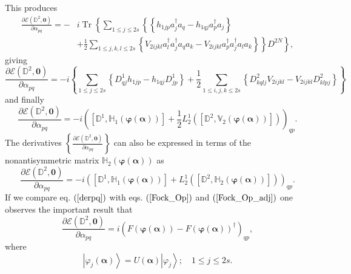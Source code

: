 \documentclass[titlepage]{article}%
\begin{document}
This produces%
\begin{align}
\frac{\partial\mathcal{E}\left(  \mathbb{D}^{2},\bm{0}\right)  }%
{\partial\alpha_{pq}}=-  &  i\operatorname{Tr}\left\{  \sum_{1\leq j\leq
2s}\left\{  \left\{  h_{1jp}a_{j}^{\dagger}a_{q}-h_{1qj}a_{p}^{\dagger}%
a_{j}\right\}  \right.  \right. \nonumber\\
&  +\left.  \left.  \frac{1}{2}\sum_{1\leq j,k,l\leq2s}\left\{  V_{2ijkl}%
a_{l}^{\dagger}a_{j}^{\dagger}a_{q}a_{k}-V_{2ijkl}a_{p}^{\dagger}%
a_{j}^{\dagger}a_{l}a_{k}\right\}  \right\}  D^{2N}\right\}  ,
\end{align}
giving%
\begin{equation}
\frac{\partial\mathcal{E}\left(  \mathbb{D}^{2},\bm{0}\right)  }%
{\partial\alpha_{pq}}=-i\left\{  \sum_{1\leq j\leq2s}\left\{  D_{qj}%
^{1}h_{1jp}-h_{1qj}D_{jp}^{1}\right\}  +\frac{1}{2}\sum_{1\leq i,j,k\leq
2s}\left\{  D_{kqlj}^{2}V_{2ijkl}-V_{2ijkl}D_{klpj}^{2}\right\}  \right\}
\end{equation}
and finally
\begin{equation}
\frac{\partial\mathcal{E}\left(  \mathbb{D}^{2},\bm{0}\right)  }%
{\partial\alpha_{pq}}=-i\left(  \left[  \mathbb{D}^{1},\mathbb{H}_{1}\left(
\bm{\varphi}\left(  \bm{\alpha}\right)  \right)  \right]  +\frac{1}{2}%
L_{2}^{1}\left(  \left[  \mathbb{D}^{2},\mathbb{V}_{2}\left(
\bm{\varphi}\left(  \bm{\alpha}\right)  \right)  \right]  \right)  \right)
_{qp}. \label{derpq}%
\end{equation}
The derivatives $\left\{  \frac{\partial\mathcal{E}\left(  \mathbb{D}%
^{2},\bm{0}\right)  }{\partial\alpha_{pq}}\right\}  $ can also be expressed in
terms of the nonantisymmetric matrix $\mathbb{H}_{2}\left(
\bm{\varphi}\left(  \bm{\alpha}\right)  \right)  $ as
\begin{equation}
\frac{\partial\mathcal{E}\left(  \mathbb{D}^{2},\bm{0}\right)  }%
{\partial\alpha_{pq}}=-i\left(  \left[  \mathbb{D}^{1},\mathbb{H}_{1}\left(
\bm{\varphi}\left(  \bm{\alpha}\right)  \right)  \right]  +L_{2}^{1}\left(
\left[  \mathbb{D}^{2},\mathbb{H}_{2}\left(  \bm{\varphi }\left(
\bm{\alpha}\right)  \right)  \right]  \right)  \right)  _{qp}. \label{derpq1}%
\end{equation}
If we compare eq. $\left(  \ref{derpq}\right)  $ with eqs. $\left(
\ref{Fock_Op}\right)  $ and $\left(  \ref{Fock_Op_adj}\right)  $ one observes
the important result that
\begin{equation}
\frac{\partial\mathcal{E}\left(  \mathbb{D}^{2},\bm{0}\right)  }%
{\partial\alpha_{pq}}=i\left(  F\left(  \bm{\varphi}\left(
\bm{\alpha }\right)  \right)  -F\left(  \bm{\varphi}\left(
\bm{\alpha}\right)  \right)  ^{\dagger}\right)  _{qp},
\end{equation}
where
\begin{equation}
\left\vert \varphi_{j}\left(  \bm{\alpha}\right)  \right\rangle =U\left(
\bm{\alpha}\right)  \left\vert \varphi_{j}\right\rangle ;\quad1\leq j\leq2s.
\end{equation}
\end{document}
